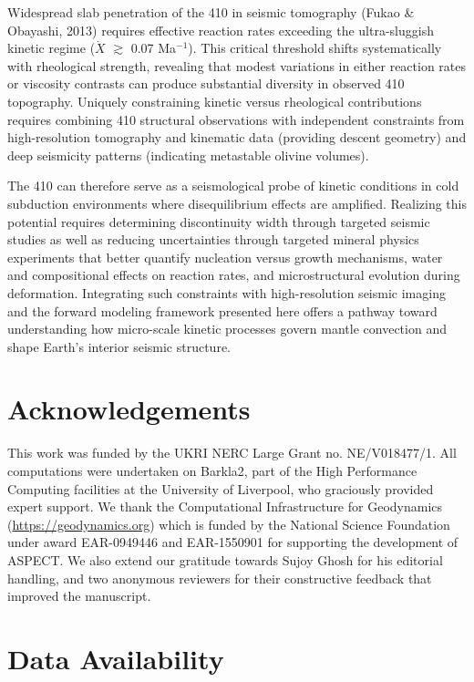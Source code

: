 \documentclass[draft,linenumbers]{agujournal2019}
\begin{document}
Widespread slab penetration of the 410 in seismic tomography (Fukao \&
Obayashi, 2013) requires effective reaction rates exceeding the
ultra-sluggish kinetic regime (\(\dot{X}\) \(\gtrsim\) 0.07
Ma\(^{-1}\)). This critical threshold shifts systematically with
rheological strength, revealing that modest variations in either
reaction rates or viscosity contrasts can produce substantial diversity
in observed 410 topography. Uniquely constraining kinetic versus
rheological contributions requires combining 410 structural observations
with independent constraints from high-resolution tomography and
kinematic data (providing descent geometry) and deep seismicity patterns
(indicating metastable olivine volumes).

The 410 can therefore serve as a seismological probe of kinetic
conditions in cold subduction environments where disequilibrium effects
are amplified. Realizing this potential requires determining
discontinuity width through targeted seismic studies as well as reducing
uncertainties through targeted mineral physics experiments that better
quantify nucleation versus growth mechanisms, water and compositional
effects on reaction rates, and microstructural evolution during
deformation. Integrating such constraints with high-resolution seismic
imaging and the forward modeling framework presented here offers a
pathway toward understanding how micro-scale kinetic processes govern
mantle convection and shape Earth's interior seismic structure.

\section*{Acknowledgements}\label{acknowledgements}

This work was funded by the UKRI NERC Large Grant no. NE/V018477/1. All
computations were undertaken on Barkla2, part of the High Performance
Computing facilities at the University of Liverpool, who graciously
provided expert support. We thank the Computational Infrastructure for
Geodynamics (\url{https://geodynamics.org}) which is funded by the
National Science Foundation under award EAR-0949446 and EAR-1550901 for
supporting the development of ASPECT. We also extend our gratitude
towards Sujoy Ghosh for his editorial handling, and two anonymous
reviewers for their constructive feedback that improved the manuscript.

\section*{Data Availability}\label{sec:data-availability}
\end{document}
